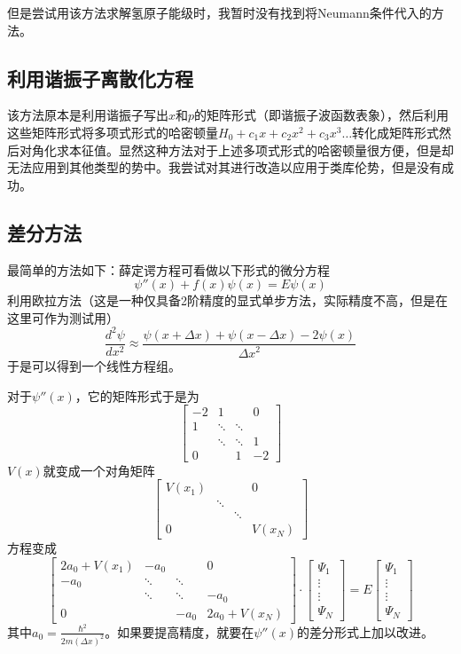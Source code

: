 \documentclass[hyperref]{ctexart}
\begin{document}
但是尝试用该方法求解氢原子能级时，我暂时没有找到将Neumann条件代入的方法。

\subsection{利用谐振子离散化方程}
该方法原本是利用谐振子写出$x$和$p$的矩阵形式（即谐振子波函数表象），然后利用这些矩阵形式将多项式形式的哈密顿量$H_0+c_1x+c_2x^2+c_3x^3\dots$转化成矩阵形式然后对角化求本征值\cite{6}。显然这种方法对于上述多项式形式的哈密顿量很方便，但是却无法应用到其他类型的势中。我尝试对其进行改造以应用于类库伦势，但是没有成功。
\subsection{差分方法}
最简单的方法如下：薛定谔方程可看做以下形式的微分方程
\begin{equation}
  \psi''(x)+f(x)\psi(x)=E\psi(x)
\end{equation}
利用欧拉方法（这是一种仅具备2阶精度的显式单步方法，实际精度不高，但是在这里可作为测试用）
\begin{equation}
\frac{d^2\psi}{d x^2}\approx \frac{\psi(x+\Delta x)+\psi(x-\Delta x)-2\psi(x)}{{\Delta x}^2}
\end{equation}
于是可以得到一个线性方程组。

对于$\psi''(x)$，它的矩阵形式于是为
$$\left[ \begin{matrix}
-2 & 1 & & 0\\
1 & \ddots & \ddots & \\
& \ddots & \ddots & 1 \\
0 & & 1 & -2 \end{matrix} \right]$$
$V(x)$就变成一个对角矩阵
$$\left[ \begin{matrix}
V(x_1) &  & & 0\\
 & \ddots & & \\
& & \ddots &  \\
0 & &  & V(x_N) \end{matrix} \right]$$
方程变成
$$\left[ \begin{matrix}
2a_0+V(x_1) & -a_0 & & 0\\
-a_0 & \ddots & \ddots & \\
& \ddots & \ddots & -a_0 \\
0 & & -a_0 & 2a_0+V(x_N) \end{matrix} \right]
\cdot
\left[\begin{matrix}
\Psi_1\\
\vdots\\
\vdots\\
\Psi_N
\end{matrix}\right]
=
E
\left[\begin{matrix}
\Psi_1\\
\vdots\\
\vdots\\
\Psi_N
\end{matrix}\right]$$
其中$\displaystyle a_0=\frac{\hbar^2}{2m(\Delta x)^2}$。如果要提高精度，就要在$\psi''(x)$的差分形式上加以改进。
\end{document}
